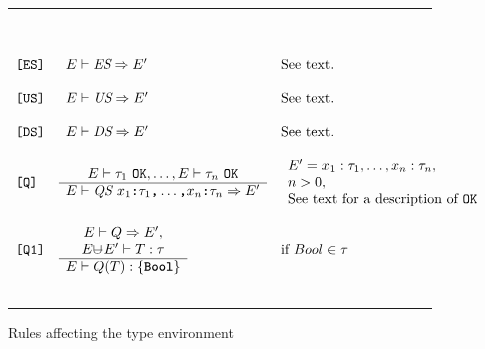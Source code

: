 \documentclass[12pt]{article} %
\newcommand{\reserved}[1]{\textbf{\texttt{#1}}} %
\newcommand{\RULELAB}[1]{\texttt{#1}}
\newcommand{\uminus}{\mbox{$\cup\!\!\!\!-$}}
\newcommand{\UNSPACEFORBOX}{\vspace{-2ex}}
\newcommand{\HLINE}{\UNSPACEFORBOX%
\begin{flushleft}\rule{\textwidth}{0.01in}\end{flushleft}%
\UNSPACEFORBOX}
\newenvironment{BFIGURE}{

\begin{figure}
\small
\HLINE
}{
\HLINE
\normalsize
\end{figure}
}
\begin{document}
\begin{BFIGURE}
\begin{displaymath}
\begin{array}{lll}
\\
~\\
\RULELAB{[ES]} &
\begin{array}{c}
E \vdash \mbox{\it ES} \Rightarrow E'
\end{array}
& \mbox{See text.}\\
~\\
\RULELAB{[US]} &
\begin{array}{c}
E \vdash \mbox{\it US} \Rightarrow E'
\end{array}
& \mbox{See text.}
\\
~\\
\RULELAB{[DS]} &
\begin{array}{c}
E \vdash \mbox{\it DS} \Rightarrow E'
\end{array}
& \mbox{See text.}
\\
~\\
\RULELAB{[Q]} &
\begin{array}{c}
E \vdash \tau_1~\mbox{\tt OK},\dots,E \vdash \tau_n~\mbox{\tt OK} \\
\hline
E \vdash \mbox{\it QS }
x_1\mbox{\reserved{:}}\tau_1\mbox{\reserved{,}}
\dots\mbox{\reserved{,}} x_n\mbox{\reserved{:}}\tau_n \Rightarrow E'
\end{array}
&
\begin{array}{l}
E' = x _1:\tau _1,\dots,x _n:\tau_n, \\
n>0, \\
\mbox{See text for a description of \tt OK}
\end{array}
\\
~\\
\RULELAB{[Q1]} &
\begin{array}{c}
E \vdash Q \Rightarrow E', \\
E \uminus E' \vdash T:\tau \\
\hline
E \vdash Q(T):\{\reserved{Bool}\}
\end{array}
&
\mbox{if $Bool \in \tau$}
\\
~\\
\end{array}
\end{displaymath}
\caption{Rules affecting the type environment}
\label{xxxxx}
\end{BFIGURE}
\end{document}
